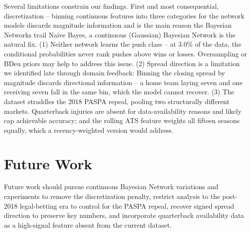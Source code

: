 \documentclass[letterpaper]{article}
\begin{document}
Several limitations constrain our findings. First and most consequential, discretization – binning continuous features into three categories for the network models discards magnitude information and is the main reason the Bayesian Networks trail Naive Bayes, a continuous (Gaussian) Bayesian Network is the natural fix. (1) Neither network learns the push class – at 3.0\% of the data, the conditional probabilities never rank pushes above wins or losses. Oversampling or BDeu priors may help to address this issue. (2) Spread direction is a limitation we identified late through domain feedback: Binning the closing spread by magnitude discards directional information – a home team laying seven and one receiving seven fall in the same bin, which the model cannot recover. (3) The dataset straddles the 2018 PASPA repeal, pooling two structurally different markets. Quarterback injuries are absent for data-availability reasons and likely cap achievable accuracy; and the rolling ATS feature weights all fifteen seasons equally, which a recency-weighted version would address. 

\section{Future Work}

Future work should pursue continuous Bayesian Network variations and experiments to remove the discretization penalty, restrict analysis to the post-2018 legal-betting era to control for the PASPA repeal, recover signed spread direction to preserve key numbers, and incorporate quarterback availability data as a high-signal feature absent from the current dataset.
\end{document}
